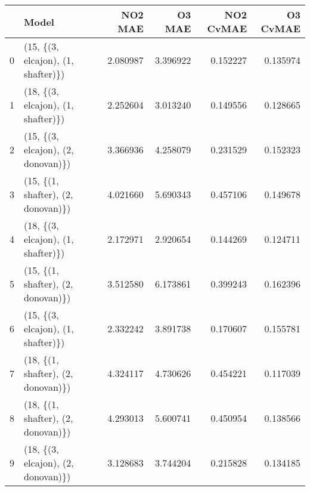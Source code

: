 \begin{tabular}{llrrrr}
\toprule
{} &                               Model &   NO2 MAE &    O3 MAE &  NO2 CvMAE &  O3 CvMAE \\
\midrule
0 &  (15, \{(3, elcajon), (1, shafter)\}) &  2.080987 &  3.396922 &   0.152227 &  0.135974 \\
1 &  (18, \{(3, elcajon), (1, shafter)\}) &  2.252604 &  3.013240 &   0.149556 &  0.128665 \\
2 &  (15, \{(3, elcajon), (2, donovan)\}) &  3.366936 &  4.258079 &   0.231529 &  0.152323 \\
3 &  (15, \{(1, shafter), (2, donovan)\}) &  4.021660 &  5.690343 &   0.457106 &  0.149678 \\
4 &  (18, \{(3, elcajon), (1, shafter)\}) &  2.172971 &  2.920654 &   0.144269 &  0.124711 \\
5 &  (15, \{(1, shafter), (2, donovan)\}) &  3.512580 &  6.173861 &   0.399243 &  0.162396 \\
6 &  (15, \{(3, elcajon), (1, shafter)\}) &  2.332242 &  3.891738 &   0.170607 &  0.155781 \\
7 &  (18, \{(1, shafter), (2, donovan)\}) &  4.324117 &  4.730626 &   0.454221 &  0.117039 \\
8 &  (18, \{(1, shafter), (2, donovan)\}) &  4.293013 &  5.600741 &   0.450954 &  0.138566 \\
9 &  (18, \{(3, elcajon), (2, donovan)\}) &  3.128683 &  3.744204 &   0.215828 &  0.134185 \\
\bottomrule
\end{tabular}

